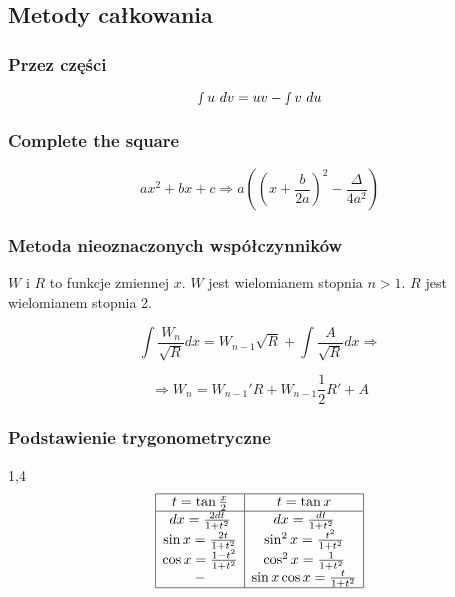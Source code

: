 \documentclass[11pt]{article}
\begin{document}
\subsection{Metody całkowania}

\subsubsection{Przez części}
\begin{equation}
	\smallint u\ dv = uv - \smallint v\ du
\end{equation}

\subsubsection{Complete the square}
\begin{equation}
	ax^2 + bx + c \Rightarrow
	a\left(\left(x + \frac{b}{2a}\right)^2 - \frac{\Delta}{4a^2}\right)
\end{equation}

\subsubsection{Metoda nieoznaczonych współczynników}

$W$ i $R$ to funkcje zmiennej $x$. $W$ jest wielomianem stopnia $n > 1$. $R$ jest wielomianem stopnia 2.

\begin{equation}
	\int \frac{W_n}{\sqrt R} dx = W_{n-1} \sqrt R + \int \frac{A}{\sqrt R} dx \Rightarrow
\end{equation}

$$
	\Rightarrow W_n = W_{n-1}' R + W_{n-1} \frac{1}{2} R' + A
$$

\subsubsection{Podstawienie trygonometryczne}

\begin{spacing}{1,4}
\[
\begin{array}{|c|c|c|}
	\hline
	t = \tan \frac{x}{2} & t = \tan x \\
	\hline
	dx = \frac{2dt}{1 + t^2} & dx = \frac{dt}{1 + t^2} \\
	\sin x = \frac{2t}{1 + t^2} & \sin^2 x = \frac{t^2}{1 + t^2} \\
	\cos x = \frac{1 - t^2}{1 + t^2} & \cos^2 x = \frac{1}{1 + t^2} \\
	- & \sin x \cos x = \frac{t}{1 + t^2} \\
	\hline
\end{array}
\]
\end{spacing}
\end{document}
